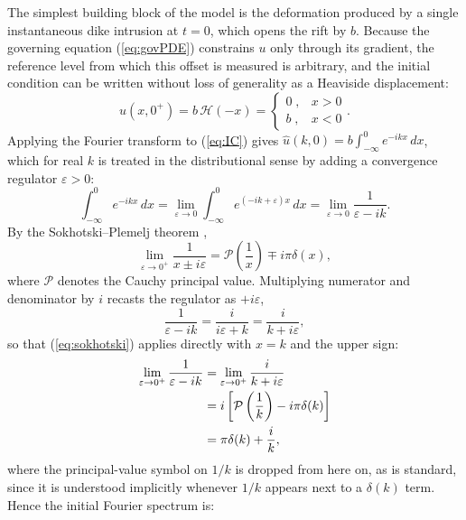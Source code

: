 \documentclass[extra]{gji}
\begin{document}
The simplest building block of the model is the deformation produced by a
single instantaneous dike intrusion at $t = 0$, which opens the rift by $b$.
Because the governing equation (\ref{eq:govPDE}) constrains $u$ only through
its gradient, the reference level from which this offset is measured is
arbitrary, and the initial condition can be written without loss of
generality as a Heaviside displacement:
\begin{equation}
u(x,0^+) = b\,\mathcal{H}(-x) = \begin{cases}
  0 \; , & x>0 \\
  b \; , & x<0
\end{cases}.
\label{eq:IC}
\end{equation}
Applying the Fourier transform to (\ref{eq:IC}) gives
$\hat{u}(k,0) = b\int_{-\infty}^{0}e^{-ikx}\,dx$,
which for real $k$ is treated in the distributional sense by adding a
convergence regulator $\varepsilon > 0$:
\begin{equation*}
\int_{-\infty}^{0}e^{-ikx}\,dx
= \lim_{\varepsilon\to 0}\int_{-\infty}^{0}e^{(-ik+\varepsilon)x}\,dx
= \lim_{\varepsilon\to 0}\frac{1}{\varepsilon - ik}.
\end{equation*}
By the Sokhotski--Plemelj theorem \citep{ablowitz2003complex},
\begin{equation}
\lim_{\varepsilon\to 0^+}\frac{1}{x \pm i\varepsilon} = \mathcal{P}\left(\frac{1}{x}\right) \mp i\pi\delta(x),
\label{eq:sokhotski}
\end{equation}
where $\mathcal{P}$ denotes the Cauchy principal value. Multiplying numerator
and denominator by $i$ recasts the regulator as $+i\varepsilon$,
\begin{equation*}
\frac{1}{\varepsilon - ik} = \frac{i}{i\varepsilon + k} = \frac{i}{k + i\varepsilon},
\end{equation*}
so that (\ref{eq:sokhotski}) applies directly with $x = k$ and the upper sign:
\begin{align}
\lim_{\varepsilon\to 0^+}\frac{1}{\varepsilon - ik}
&= \lim_{\varepsilon\to 0^+}\frac{i}{k + i\varepsilon} \notag\\
&= i\left[\mathcal{P}\left(\frac{1}{k}\right) - i\pi\delta(k)\right] \notag\\
&= \pi\delta(k) + \frac{i}{k}, \label{eq:sokhotski_applied}
\end{align}
where the principal-value symbol on $1/k$ is dropped from here on, as is
standard, since it is understood implicitly whenever $1/k$ appears next to a
$\delta(k)$ term. Hence the initial Fourier spectrum is:
\end{document}
